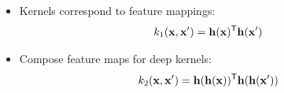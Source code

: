 \documentclass[portrait,a0b,final,a4resizeable]{include/a0poster}
\newcommand{\feat}{\vh}
\begin{document}
\begin{poster}
\begin{multicols}{2}
\vspace*{-1cm}
\begin{minipage}[c]{0.6\columnwidth}
\begin{itemize}
\item Kernels correspond to feature mappings:
$${k_1(\vx, \vx') = \feat(\vx) \tra \feat(\vx')}$$
\item Compose feature maps for deep kernels:
$${k_2(\vx, \vx') = \feat(\feat(\vx)) \tra \feat(\feat(\vx'))}$$
%

%
%
%
%
%


\end{itemize}
\end{minipage}
\end{multicols}
\end{poster}
\end{document}
